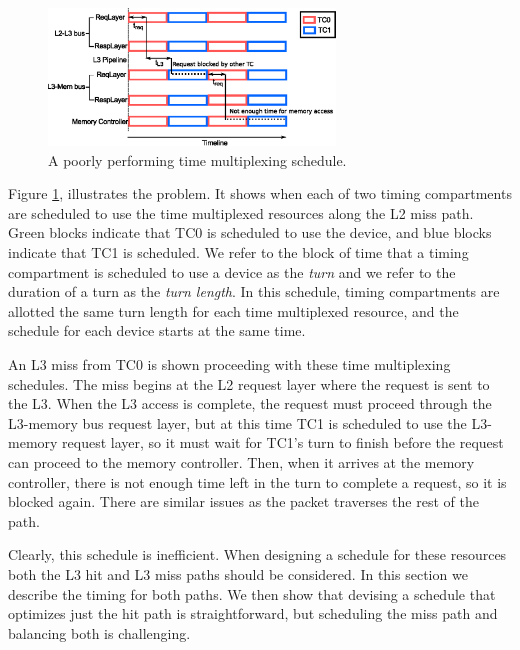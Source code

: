 \begin{figure}
    \begin{center}
        \includegraphics[width=3.0in]{figs/problem.eps}
        \caption{A poorly performing time multiplexing schedule.}
        \label{fig:problem}
    \end{center}
\end{figure}

Figure \ref{fig:problem}, illustrates the problem. It shows when each of two 
timing compartments are scheduled to use the time multiplexed resources along 
the L2 miss path. Green blocks indicate that TC0 is scheduled to use the device, 
and blue blocks indicate that TC1 is scheduled. We refer to the block of time 
that a timing compartment is scheduled to use a device as the \emph{turn} and 
we refer to the duration of a turn as the \emph{turn length}. In this schedule, 
timing compartments are allotted the same turn length for each time multiplexed 
resource, and the schedule for each device starts at the same time.

An L3 miss from TC0 is shown proceeding with these time multiplexing schedules.
The miss begins at the L2 request layer where the request is sent to the L3.  
When the L3 access is complete, the request must proceed through the L3-memory 
bus request layer, but at this time TC1 is scheduled to use the L3-memory 
request layer, so it must wait for TC1's turn to finish before the request can 
proceed to the memory controller. Then, when it arrives at the memory 
controller, there is not enough time left in the turn to complete a request, so 
it is blocked again. There are similar issues as the packet traverses the rest
of the path.

Clearly, this schedule is inefficient. When designing a schedule for these 
resources both the L3 hit and L3 miss paths should be considered. In this 
section we describe the timing for both paths. We then show that devising a 
schedule that optimizes just the hit path is straightforward, but scheduling 
the miss path and balancing both is challenging.

